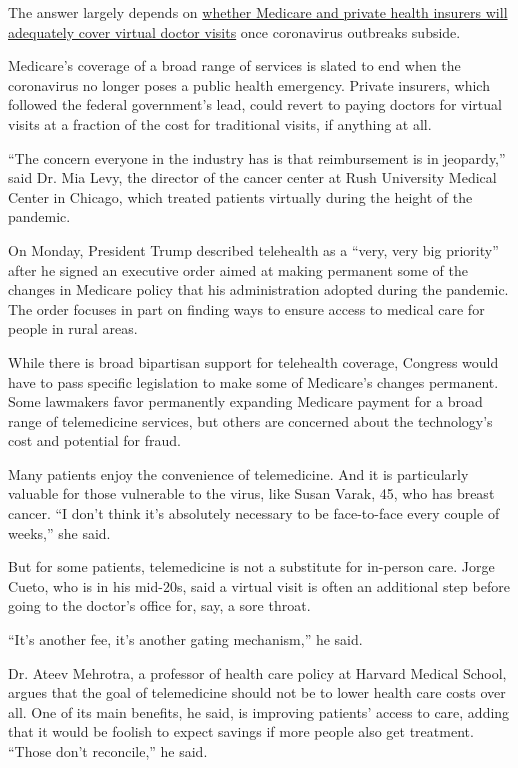 The answer largely depends on
\href{https://www.nytimes.com/2020/08/03/health/covid-telemedicine-congress.html}{whether
Medicare and private health insurers will adequately cover virtual
doctor visits} once coronavirus outbreaks subside.

Medicare's coverage of a broad range of services is slated to end when
the coronavirus no longer poses a public health emergency. Private
insurers, which followed the federal government's lead, could revert to
paying doctors for virtual visits at a fraction of the cost for
traditional visits, if anything at all.

``The concern everyone in the industry has is that reimbursement is in
jeopardy,'' said Dr. Mia Levy, the director of the cancer center at Rush
University Medical Center in Chicago, which treated patients virtually
during the height of the pandemic.

On Monday, President Trump described telehealth as a ``very, very big
priority'' after he signed an executive order aimed at making permanent
some of the changes in Medicare policy that his administration adopted
during the pandemic. The order focuses in part on finding ways to ensure
access to medical care for people in rural areas.

While there is broad bipartisan support for telehealth coverage,
Congress would have to pass specific legislation to make some of
Medicare's changes permanent. Some lawmakers favor permanently expanding
Medicare payment for a broad range of telemedicine services, but others
are concerned about the technology's cost and potential for fraud.

Many patients enjoy the convenience of telemedicine. And it is
particularly valuable for those vulnerable to the virus, like Susan
Varak, 45, who has breast cancer. ``I don't think it's absolutely
necessary to be face-to-face every couple of weeks,'' she said.

But for some patients, telemedicine is not a substitute for in-person
care. Jorge Cueto, who is in his mid-20s, said a virtual visit is often
an additional step before going to the doctor's office for, say, a sore
throat.

``It's another fee, it's another gating mechanism,'' he said.

Dr. Ateev Mehrotra, a professor of health care policy at Harvard Medical
School, argues that the goal of telemedicine should not be to lower
health care costs over all. One of its main benefits, he said, is
improving patients' access to care, adding that it would be foolish to
expect savings if more people also get treatment. ``Those don't
reconcile,'' he said.


